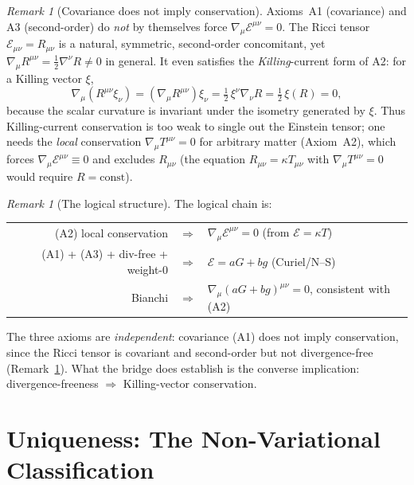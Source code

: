 \documentclass[12pt]{article}
\theoremstyle{plain}
\theoremstyle{definition}
\theoremstyle{remark}
\newtheorem{remark}[theorem]{Remark}
\begin{document}
\begin{remark}[Covariance does not imply conservation]\label{rmk:ricci-counterexample}
Axioms~A1 (covariance) and A3 (second-order) do \emph{not} by themselves force $\nabla_\mu\mathcal{E}^{\mu\nu} = 0$. The Ricci tensor $\mathcal{E}_{\mu\nu} = R_{\mu\nu}$ is a natural, symmetric, second-order concomitant, yet $\nabla_\mu R^{\mu\nu} = \tfrac12\nabla^\nu R \neq 0$ in general. It even satisfies the \emph{Killing}-current form of A2: for a Killing vector $\xi$,
\[
\nabla_\mu(R^{\mu\nu}\xi_\nu) = (\nabla_\mu R^{\mu\nu})\xi_\nu = \tfrac12\,\xi^\nu\nabla_\nu R = \tfrac12\,\xi(R) = 0,
\]
because the scalar curvature is invariant under the isometry generated by $\xi$. Thus Killing-current conservation is too weak to single out the Einstein tensor; one needs the \emph{local} conservation $\nabla_\mu T^{\mu\nu} = 0$ for arbitrary matter (Axiom~A2), which forces $\nabla_\mu\mathcal{E}^{\mu\nu} \equiv 0$ and excludes $R_{\mu\nu}$ (the equation $R_{\mu\nu} = \kappa T_{\mu\nu}$ with $\nabla_\mu T^{\mu\nu} = 0$ would require $R = \mathrm{const}$).
\end{remark}

\begin{remark}[The logical structure]\label{rmk:logic}
The logical chain is:
\begin{center}
\begin{tabular}{rcl}
(A2) local conservation & $\Rightarrow$ & $\nabla_\mu\mathcal{E}^{\mu\nu} = 0$ (from $\mathcal{E} = \kappa T$) \\
(A1) + (A3) + div-free + weight-$0$ & $\Rightarrow$ & $\mathcal{E} = aG + bg$ (Curiel/N--S) \\
Bianchi & $\Rightarrow$ & $\nabla_\mu(aG+bg)^{\mu\nu} = 0$, consistent with (A2)
\end{tabular}
\end{center}
The three axioms are \emph{independent}: covariance (A1) does not imply conservation, since the Ricci tensor is covariant and second-order but not divergence-free (Remark~\ref{rmk:ricci-counterexample}). What the bridge does establish is the converse implication: divergence-freeness $\Rightarrow$ Killing-vector conservation.
\end{remark}


\section{Uniqueness: The Non-Variational Classification}
\label{sec:uniqueness}
\end{document}
